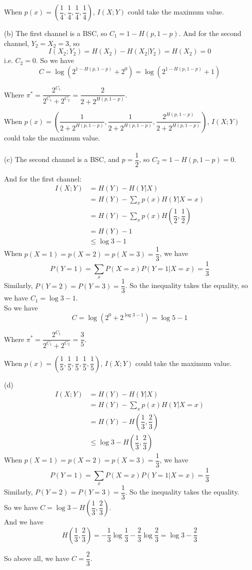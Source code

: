 When $p(x)=\left(\dfrac{1}{4},\dfrac{1}{4},\dfrac{1}{4},\dfrac{1}{4}\right)$, $I(X;Y)$ could take the maximum value.

(b) The first channel is a BSC, so $C_1=1-H(p,1-p)$. And for the second channel, $Y_2=X_2=3$, so
$$I(X_2;Y_2)=H(X_2)-H(X_2|Y_2)=H(X_2)=0$$
i.e. $C_2=0$. So we have
$$C=\log\left(2^{1-H(p,1-p)}+2^0\right)=\log\left(2^{1-H(p,1-p)}+1\right)$$

Where $\pi^*=\dfrac{2^{C_1}}{2^{C_1}+2^{C_2}}=\dfrac{2}{2+2^{H\left(p,1-p\right)}}$.

When $p(x)=\left(\dfrac{1}{2+2^{H\left(p,1-p\right)}},\dfrac{1}{2+2^{H\left(p,1-p\right)}},\dfrac{2^{H\left(p,1-p\right)}}{2+2^{H\left(p,1-p\right)}}\right)$, $I(X;Y)$ could take the maximum value. \\\\


(c) The second channel is a BSC, and $p=\dfrac{1}{2}$, so $C_2=1-H(p,1-p)=0$.

And for the first channel:
\begin{align*}
I(X;Y) &= H(Y) - H(Y|X) \\
&= H(Y) - \sum_{x}p(x)H(Y|X=x) \\
&= H(Y) - \sum_{x}p(x)H\left(\dfrac{1}{2},\dfrac{1}{2}\right) \\
&= H(Y) - 1 \\
&\leq \log 3 - 1
\end{align*}
When $p(X=1)=p(X=2)=p(X=3)=\dfrac{1}{3}$, we have
$$P(Y=1)=\sum_xP(X=x)P(Y=1|X=x)=\dfrac{1}{3}$$
Similarly, $P(Y=2)=P(Y=3)=\dfrac{1}{3}$. So the inequality takes the equality, so we have $C_1=\log 3 - 1$. \\
So we have
$$C=\log\left(2^0+2^{\log 3-1}\right)=\log 5 - 1$$

Where $\pi^*=\dfrac{2^{C_1}}{2^{C_1}+2^{C_2}}=\dfrac{3}{5}$.

When $p(x)=\left(\dfrac{1}{5},\dfrac{1}{5},\dfrac{1}{5},\dfrac{1}{5},\dfrac{1}{5}\right)$, $I(X;Y)$ could take the maximum value.

(d)
\begin{align*}
I(X;Y) &= H(Y) - H(Y|X) \\
&= H(Y) - \sum_{x}p(x)H(Y|X=x) \\
&= H(Y) - H\left(\dfrac{1}{3},\dfrac{2}{3}\right) \\
&\leq \log 3 - H\left(\dfrac{1}{3},\dfrac{2}{3}\right)
\end{align*}
When $p(X=1)=p(X=2)=p(X=3)=\dfrac{1}{3}$, we have
$$P(Y=1)=\sum_xP(X=x)P(Y=1|X=x)=\dfrac{1}{3}$$
Similarly, $P(Y=2)=P(Y=3)=\dfrac{1}{3}$. So the inequality takes the equality. \\
So we have $C=\log 3 - H\left(\dfrac{1}{3},\dfrac{2}{3}\right)$. \\
And we have
$$H\left(\dfrac{1}{3},\dfrac{2}{3}\right) = -\dfrac{1}{3}\log\dfrac{1}{3}-\dfrac{2}{3}\log\dfrac{2}{3} = \log 3 - \dfrac{2}{3}$$

So above all, we have $C=\dfrac{2}{3}$.

\newpage